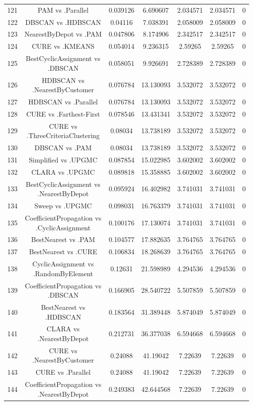 \documentclass[a4paper,10pt]{article}
\begin{document}
\begin{landscape}
\begin{table}[!htp]
\begin{tabular}{ccccccc}
121&PAM vs .Parallel&0.039126&6.690607&2.034571&2.034571&0\\
122&DBSCAN vs .HDBSCAN&0.04116&7.038391&2.058009&2.058009&0\\
123&NearestByDepot vs .PAM&0.047806&8.174906&2.342517&2.342517&0\\
124&CURE vs .KMEANS&0.054014&9.236315&2.59265&2.59265&0\\
125&BestCyclicAssignment vs .DBSCAN&0.058051&9.926691&2.728389&2.728389&0\\
126&HDBSCAN vs .NearestByCustomer&0.076784&13.130093&3.532072&3.532072&0\\
127&HDBSCAN vs .Parallel&0.076784&13.130093&3.532072&3.532072&0\\
128&CURE vs .Farthest-First&0.078546&13.431341&3.532072&3.532072&0\\
129&CURE vs .ThreeCriteriaClustering&0.08034&13.738189&3.532072&3.532072&0\\
130&DBSCAN vs .PAM&0.08034&13.738189&3.532072&3.532072&0\\
131&Simplified vs .UPGMC&0.087854&15.022985&3.602002&3.602002&0\\
132&CLARA vs .UPGMC&0.089818&15.358885&3.602002&3.602002&0\\
133&BestCyclicAssignment vs .NearestByDepot&0.095924&16.402982&3.741031&3.741031&0\\
134&Sweep vs .UPGMC&0.098031&16.763379&3.741031&3.741031&0\\
135&CoefficientPropagation vs .CyclicAssignment&0.100176&17.130074&3.741031&3.741031&0\\
136&BestNearest vs .PAM&0.104577&17.882635&3.764765&3.764765&0\\
137&BestNearest vs .CURE&0.106834&18.268639&3.764765&3.764765&0\\
138&CyclicAssignment vs .RandomByElement&0.12631&21.598989&4.294536&4.294536&0\\
139&CoefficientPropagation vs .DBSCAN&0.166905&28.540722&5.507859&5.507859&0\\
140&BestNearest vs .HDBSCAN&0.183564&31.389448&5.874049&5.874049&0\\
141&CLARA vs .NearestByDepot&0.212731&36.377038&6.594668&6.594668&0\\
142&CURE vs .NearestByCustomer&0.24088&41.19042&7.22639&7.22639&0\\
143&CURE vs .Parallel&0.24088&41.19042&7.22639&7.22639&0\\
144&CoefficientPropagation vs .NearestByDepot&0.249383&42.644568&7.22639&7.22639&0\\

\end{tabular}
\end{table}
\end{landscape}
\end{document}
